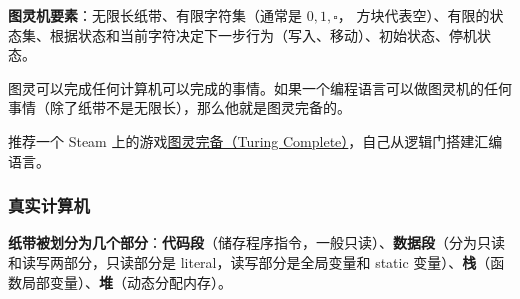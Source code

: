 

\textbf{图灵机要素}：无限长纸带、有限字符集（通常是 ${0,1,\square}$， 方块代表空）、有限的状态集、根据状态和当前字符决定下一步行为（写入、移动）、初始状态、停机状态。

图灵可以完成任何计算机可以完成的事情。如果一个编程语言可以做图灵机的任何事情（除了纸带不是无限长），那么他就是图灵完备的。

推荐一个 Steam 上的游戏\href{https://store.steampowered.com/app/1444480/Turing_Complete/}{图灵完备（Turing Complete）}，自己从逻辑门搭建汇编语言。

\subsubsection{真实计算机}
\textbf{纸带被划分为几个部分}：\textbf{代码段}（储存程序指令，一般只读）、\textbf{数据段}（分为只读和读写两部分，只读部分是 literal，读写部分是全局变量和 static 变量）、\textbf{栈}（函数局部变量）、\textbf{堆}（动态分配内存）。

